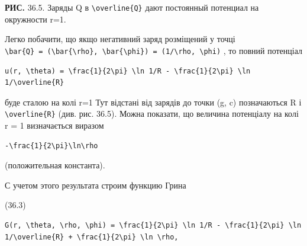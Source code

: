 \documentclass[
  ukrainian,
]{article}
\begin{document}
\textbf{РИС.} 36.5. Заряды Q в \texttt{\textbackslash{}overline\{Q\}}
дают постоянный потенциал на окружности r=1.

Легко побачити, що якщо негативний заряд розміщений у точці
\texttt{\textbackslash{}bar\{Q\}\ =\ (\textbackslash{}bar\{\textbackslash{}rho\},\ \textbackslash{}bar\{\textbackslash{}phi\})\ =\ (1/\textbackslash{}rho,\ \textbackslash{}phi)}
, то повний потенціал

\begin{verbatim}
u(r, \theta) = \frac{1}{2\pi} \ln 1/R - \frac{1}{2\pi} \ln 1/\overline{R}
\end{verbatim}

буде сталою на колі r=1 Тут відстані від зарядів до точки (g, c)
позначаються R і \texttt{\textbackslash{}overline\{R\}} (див. рис.
36.5). Можна показати, що величина потенціалу на колі r = 1 визначається
виразом

\begin{verbatim}
-\frac{1}{2\pi}\ln\rho
\end{verbatim}

(положительная константа).

С учетом этого результата строим функцию Грина

(36.3)

\begin{verbatim}
G(r, \theta, \rho, \phi) = \frac{1}{2\pi} \ln 1/R - \frac{1}{2\pi} \ln 1/\overline{R} + \frac{1}{2\pi} \ln \rho,
\end{verbatim}
\end{document}
